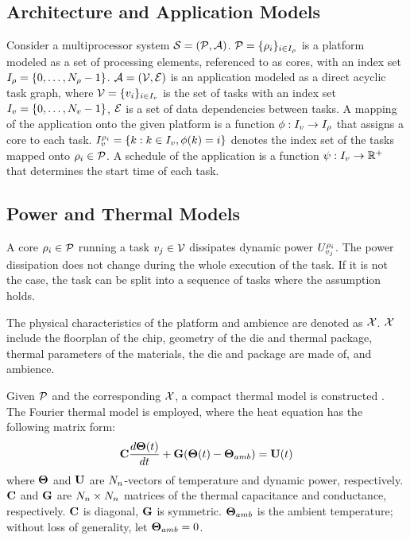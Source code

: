 \subsection{Architecture and Application Models}
Consider a multiprocessor system $\mathcal{S} = (\mathcal{P}, \mathcal{A})$. $\mathcal{P} = \{ \rho_i \}_{i \in I_\rho}$ is a platform modeled as a set of processing elements, referenced to as cores, with an index set $I_\rho = \{ 0, \dots, N_\rho - 1 \}$. $\mathcal{A} = (\mathcal{V}, \mathcal{E})$ is an application modeled as a direct acyclic task graph, where $\mathcal{V} = \{v_i\}_{i \in I_v}$ is the set of tasks with an index set $I_v = \{ 0, \dots, N_v - 1 \}$, $\mathcal{E}$ is a set of data dependencies between tasks. A mapping of the application onto the given platform is a function $\phi: I_v \to I_\rho$ that assigns a core to each task. $I_v^{\rho_i} = \{ k: k \in I_v, \phi(k) = i \}$ denotes the index set of the tasks mapped onto $\rho_i \in \mathcal{P}$. A schedule of the application is a function $\psi: I_v \to \mathbb{R}^{+}$ that determines the start time of each task.

\subsection{Power and Thermal Models}
A core $\rho_i \in \mathcal{P}$ running a task $v_j \in \mathcal{V}$ dissipates dynamic power $U^{\rho_i}_{v_j}$. The power dissipation does not change during the whole execution of the task. If it is not the case, the task can be split into a sequence of tasks where the assumption holds.

The physical characteristics of the platform and ambience are denoted as $\mathcal{X}$. $\mathcal{X}$ include the floorplan of the chip, geometry of the die and thermal package, thermal parameters of the materials, the die and package are made of, and ambience.

Given $\mathcal{P}$ and the corresponding $\mathcal{X}$, a compact thermal model is constructed \cite{huang2006}. The Fourier thermal model is employed, where the heat equation has the following matrix form:
\begin{equation} \equlabel{fourier}
  \mcapacitance \frac{d\vtemperature(\time)}{d\time} + \mconductance (\vtemperature(\time) - \vtemperature_{amb}) = \vpower(\time)
\end{equation}
where $\mathbf{\Theta}$ and $\mathbf{U}$ are $N_n$-vectors of temperature and dynamic power, respectively. $\mathbf{C}$ and $\mathbf{G}$ are $N_n \times N_n$ matrices of the thermal capacitance and conductance, respectively. $\mathbf{C}$ is diagonal, $\mathbf{G}$ is symmetric. $\mathbf{\Theta}_{amb}$ is the ambient temperature; without loss of generality, let $\mathbf{\Theta}_{amb} = 0$.
